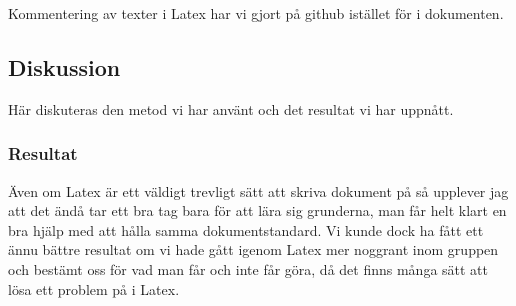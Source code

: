 
Kommentering av texter i Latex har vi gjort på github istället för i dokumenten.



\subsection{Diskussion}
Här diskuteras den metod vi har använt och det resultat vi har uppnått.





\subsubsection{Resultat}
Även om Latex är ett väldigt trevligt sätt att skriva dokument på så upplever jag att det ändå tar ett bra tag bara för att lära sig grunderna, man får helt klart en bra hjälp med att hålla samma dokumentstandard. Vi kunde dock ha fått ett ännu bättre resultat om vi hade gått igenom Latex mer noggrant inom gruppen och bestämt oss för vad man får och inte får göra, då det finns många sätt att lösa ett problem på i Latex.

